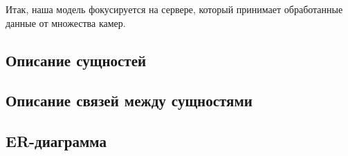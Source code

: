 Итак, наша модель фокусируется на сервере, который принимает 
обработанные данные от множества камер.

\subsection{Описание сущностей}

\subsection{Описание связей между сущностями}

\newpage
\subsection{ER-диаграмма}

